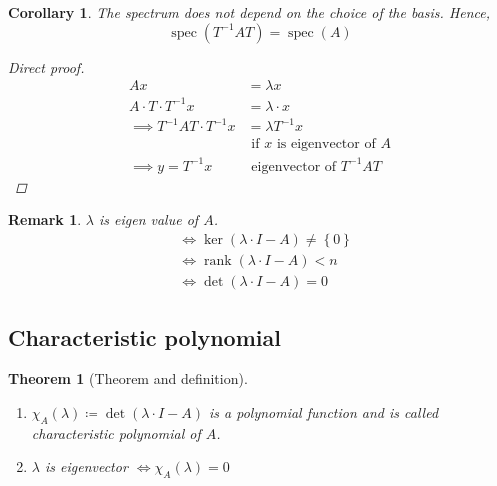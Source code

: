 \documentclass{article}
\newtheorem{theorem}{Theorem}  \numberwithin{theorem}{section}
\newtheorem{remark}{Remark}  \numberwithin{remark}{section}
\newtheorem*{corollary}{Corollary}%
\newcommand{\set}[1]{\left\{#1\right\}}
\DeclareMathOperator{\rank}{rank}
\begin{document}
\begin{corollary}
  The spectrum does not depend on the choice of the basis. Hence,
  \[ \operatorname{spec}(T^{-1} AT) = \operatorname{spec}(A) \]

  \begin{proof}[Direct proof]
    \begin{align*}
      Ax &= \lambda x \\
      A \cdot T \cdot T^{-1} x &= \lambda \cdot x \\
      \implies T^{-1} AT \cdot T^{-1} x &= \lambda T^{-1} x \\
        &\text{ if } x \text{ is eigenvector of } A \\
      \implies y = T^{-1} x &\text{ eigenvector of } T^{-1} AT
    \end{align*}
  \end{proof}
\end{corollary}

\begin{remark}
  $\lambda$ is eigen value of $A$.
  \begin{align*}
    &\iff \ker(\lambda \cdot I - A) \neq \set{0} \\
    &\iff \rank(\lambda \cdot I - A) < n \\
    &\iff \det(\lambda \cdot I - A) = 0
  \end{align*}
\end{remark}

\subsection{Characteristic polynomial}

\begin{theorem}[Theorem and definition] \hfill{} %
  \begin{enumerate}
    \item $\chi_A(\lambda) \coloneqq \det(\lambda \cdot I - A)$ is a polynomial function and is called \emph{characteristic polynomial of $A$}.
    \item $\lambda$ is eigenvector $\iff \chi_A(\lambda) = 0$
  \end{enumerate}
\end{theorem}
\end{document}
